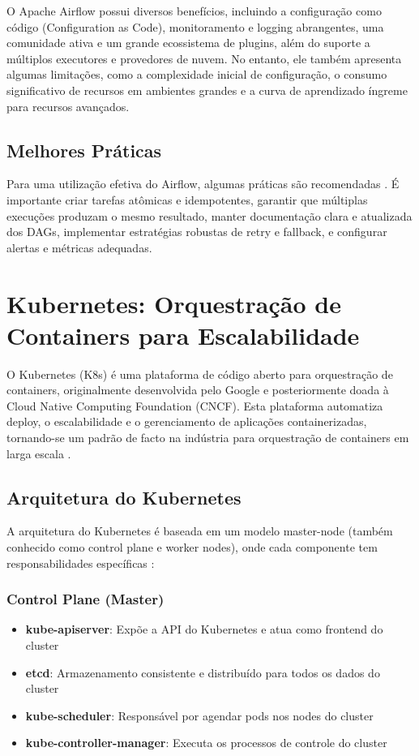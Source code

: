 O Apache Airflow possui diversos benefícios, incluindo a configuração como código (Configuration as Code), monitoramento e logging abrangentes, uma comunidade ativa e um grande ecossistema de plugins, além do suporte a múltiplos executores e provedores de nuvem. No entanto, ele também apresenta algumas limitações, como a complexidade inicial de configuração, o consumo significativo de recursos em ambientes grandes e a curva de aprendizado íngreme para recursos avançados.

\subsection{Melhores Práticas}
Para uma utilização efetiva do Airflow, algumas práticas são recomendadas \cite{airflow_practices}. É importante criar tarefas atômicas e idempotentes, garantir que múltiplas execuções produzam o mesmo resultado, manter documentação clara e atualizada dos DAGs, implementar estratégias robustas de retry e fallback, e configurar alertas e métricas adequadas.



\section{Kubernetes: Orquestração de Containers para Escalabilidade}
O Kubernetes (K8s) é uma plataforma de código aberto para orquestração de containers, originalmente desenvolvida pelo Google e posteriormente doada à Cloud Native Computing Foundation (CNCF). Esta plataforma automatiza deploy, o escalabilidade e o gerenciamento de aplicações containerizadas, tornando-se um padrão de facto na indústria para orquestração de containers em larga escala \cite{burns2019kubernetes}.
\subsection{Arquitetura do Kubernetes}
A arquitetura do Kubernetes é baseada em um modelo master-node (também conhecido como control plane e worker nodes), onde cada componente tem responsabilidades específicas \cite{kubernetes_arch}:
\subsubsection{Control Plane (Master)}
\begin{itemize}
\item \textbf{kube-apiserver}: Expõe a API do Kubernetes e atua como frontend do cluster
\item \textbf{etcd}: Armazenamento consistente e distribuído para todos os dados do cluster
\item \textbf{kube-scheduler}: Responsável por agendar pods nos nodes do cluster
\item \textbf{kube-controller-manager}: Executa os processos de controle do cluster
\end{itemize}

